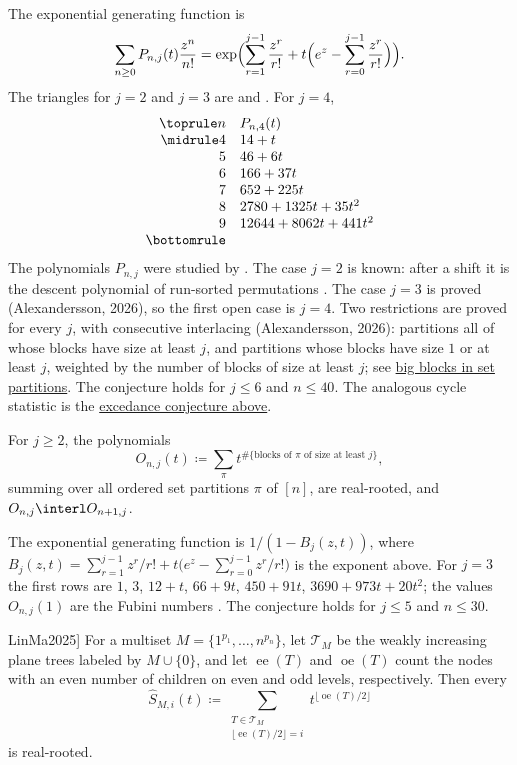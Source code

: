 The exponential generating function is
\[
  \sum_{n\geq0}P_{n,j}(t)\frac{z^n}{n!}
  =\exp\Bigl(\sum_{r=1}^{j-1}\frac{z^r}{r!}
  +t\Bigl(e^z-\sum_{r=0}^{j-1}\frac{z^r}{r!}\Bigr)\Bigr).
\]
The triangles for $j=2$ and $j=3$ are  and .
For $j=4$,
\[
\begin{array}{rl}
\toprule
n & P_{n,4}(t) \\
\midrule
4 & 14+t \\
5 & 46+6t \\
6 & 166+37t \\
7 & 652+225t \\
8 & 2780+1325t+35t^2 \\
9 & 12644+8062t+441t^2 \\
\bottomrule
\end{array}
\]
The polynomials $P_{n,j}$ were studied by  \cite{Zhan2023}.
The case $j=2$ is known: after a shift it is the descent polynomial of run-sorted
permutations \cite{AlexanderssonNabawanda2021,BonaHezo2016}.  The case $j=3$ is proved
(Alexandersson, 2026), so the first open case is $j=4$.  Two restrictions are proved for
every $j$, with consecutive interlacing (Alexandersson, 2026): partitions all of whose blocks
have size at least $j$, and partitions whose blocks have size $1$ or at least $j$, weighted
by the number of blocks of size at least $j$; see
\hyperref[bigBlockSetPartitions]{big blocks in set partitions}.  The conjecture holds for
$j\leq6$ and $n\leq40$.  The analogous cycle statistic is the
\hyperref[conjLongCycleExcedances]{excedance conjecture above}.

\begin{conjecture}[Alexandersson, 2026]
\label{conjOrderedBigBlocks}
For $j\geq2$, the polynomials
\[
  O_{n,j}(t)\coloneqq\sum_{\pi}t^{\#\{\text{blocks of $\pi$ of size at least $j$}\}},
\]
summing over all ordered set partitions $\pi$ of $[n]$, are real-rooted, and
$O_{n,j}\interl O_{n+1,j}$.
\end{conjecture}

The exponential generating function is $1/(1-B_j(z,t))$, where
$B_j(z,t)=\sum_{r=1}^{j-1}z^r/r!+t\bigl(e^z-\sum_{r=0}^{j-1}z^r/r!\bigr)$ is the exponent
above.  For $j=3$ the first rows are $1$, $3$, $12+t$, $66+9t$, $450+91t$,
$3690+973t+20t^2$; the values $O_{n,j}(1)$ are the Fubini numbers .  The
conjecture holds for $j\leq5$ and $n\leq30$.

\begin{conjecture}[Lin--Ma, \cite[Conj.~5.1]{LinMa2025}]
\label{conjReducedSchett}
For a multiset $M=\{1^{p_1},\dotsc,n^{p_n}\}$, let $\mathcal{T}_M$ be the
weakly increasing plane trees labeled by $M\cup\{0\}$, and let
$\operatorname{ee}(T)$ and $\operatorname{oe}(T)$ count the nodes with an
even number of children on even and odd levels, respectively.  Then every
\[
  \widehat{S}_{M,i}(t)\coloneqq
  \sum_{\substack{T\in\mathcal{T}_M\\
  \lfloor\operatorname{ee}(T)/2\rfloor=i}}
  t^{\lfloor\operatorname{oe}(T)/2\rfloor}
\]
is real-rooted.
\end{conjecture}

